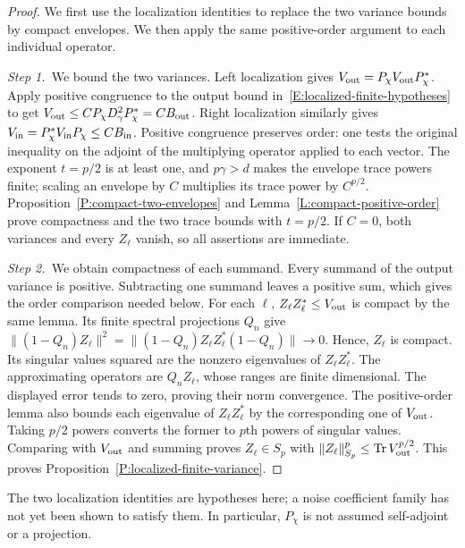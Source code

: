 \begin{proof}
  We first use the localization identities to replace the two variance
  bounds by compact envelopes. We then apply the same positive-order argument
  to each individual operator.

  \medskip
  \noindent\textit{Step 1.~}We bound the two variances.
  Left localization gives $V_{\rm out} = P_\chi V_{\rm out}P_\chi^*$. Apply
  positive congruence to the output bound
  in~\eqref{E:localized-finite-hypotheses} to get $V_{\rm out} \le CP_\chi
  D_\gamma^2P_\chi^* = CB_{\rm out}$. Right localization similarly gives $V_{\rm
  in} = P_\chi^*V_{\rm in}P_\chi \le CB_{\rm in}$.
  Positive congruence preserves order: one tests the original inequality
  on the adjoint of the multiplying operator applied to each vector.
  The exponent $t=p/2$ is at least one, and $p\gamma>d$ makes the envelope
  trace powers finite; scaling an envelope by $C$ multiplies its trace power
  by $C^{p/2}$.
  Proposition~\ref{P:compact-two-envelopes} and
  Lemma~\ref{L:compact-positive-order} prove compactness and the two trace
  bounds with $t = p/2$. If $C = 0$, both variances and every $Z_\ell$ vanish,
  so all assertions are immediate.


  \medskip
  \noindent\textit{Step 2.~}We obtain compactness of each summand.
  Every summand of the output variance is positive. Subtracting one summand
  leaves a positive sum, which gives the order comparison needed below.
  For each $\ell$, $Z_\ell Z_\ell^* \le V_{\rm out}$ is compact by the same
  lemma. Its finite spectral projections $Q_n$ give $\|(1-Q_n)Z_\ell\|^2 =
  \|(1-Q_n)Z_\ell Z_\ell^*(1-Q_n)\| \to 0$. Hence, $Z_\ell$ is compact. Its
  singular values squared are the nonzero eigenvalues of $Z_\ell Z_\ell^*$.
  The approximating operators are $Q_nZ_\ell$, whose ranges are finite
  dimensional. The displayed error tends to zero, proving their norm
  convergence. The positive-order lemma also bounds each eigenvalue of
  $Z_\ell Z_\ell^*$ by the corresponding one of $V_{\rm out}$. Taking
  $p/2$ powers converts the former to $p$th powers of singular values.
  Comparing with $V_{\rm out}$ and summing proves $Z_\ell \in S_p$ with
  $\|Z_\ell\|_{S_p}^p \le \operatorname{Tr}V_{\rm out}^{p/2}$. This proves
  Proposition~\ref{P:localized-finite-variance}.
\end{proof}

The two localization identities are hypotheses here; a noise coefficient family
has not yet been shown to satisfy them. In particular, $P_\chi$ is not assumed
self-adjoint or a projection.

